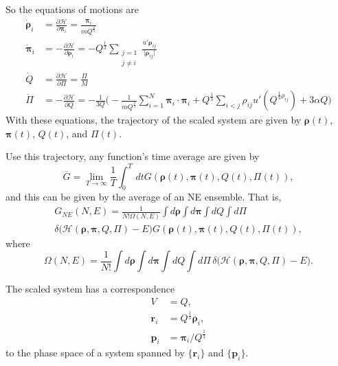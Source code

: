So the equations of motions are
\begin{align}
	\dot{ \bm{\rho} }_i & = \frac{ \partial \mathcal{H} }{ \partial \bm{\pi}_i } =
	\frac{ \bm{\pi}_i }{ m Q^{\frac{ 2 }{ 3 }} }\\
	\dot{ \bm{\pi} }_i  & = - \frac{ \partial \mathcal{H} }{ \partial \bm{\rho}_i } =
	- Q^{\frac{ 1 }{ 3 }} \sum_{\substack{j=1\\j\neq i}}
	\frac{ u' \bm{\rho}_{ij} }{ \lvert \bm{\rho}_{ij} \rvert  }\\
	\dot{ Q }           & = \frac{ \partial \mathcal{H} }{ \partial \Pi } =
	\frac{ \Pi }{ M } \\
	\dot{ \Pi }         & = - \frac{ \partial \mathcal{H} }{ \partial Q } =
	- \frac{ 1 }{ 3Q } \bigg(
	- \frac{ 1 }{ m Q^{\frac{ 2 }{ 3 }} }	\sum_{i=1}^{N} \bm{\pi}_i \cdot \bm{\pi}_i
	+ Q^{\frac{ 1 }{ 3 }} \sum_{i<j} \rho_{ij} u'(Q^{\frac{ 1 }{ 3 } \rho_{ij}}) +
	3 \alpha Q
	\bigg)
\end{align}
With these equations, the trajectory of the scaled system are given by
$\bm{\rho}(t)$, $\bm{\pi}(t)$, $Q(t)$, and $\Pi(t)$.

Use this trajectory, any function's time average are given by
\begin{equation}
	\overline{G} = \lim_{T \rightarrow \infty} \frac{ 1 }{ T } \int_{0}^{T}  \, dt
	G(\bm{\rho}(t), \bm{\pi}(t), Q(t), \Pi(t)),
\end{equation}
and this can be given by the average of an NE ensemble. That is,
\begin{multline}
	G_{NE} (N, E) = \frac{ 1 }{ N! \Omega(N,E) } \int d\bm{\rho} \int d\bm{\pi}
	\int dQ \int d\Pi \\
	\delta \big( \mathcal{H}(\bm{\rho}, \bm{\pi}, Q, \Pi)
	- E \big) G(\bm{\rho}(t), \bm{\pi}(t), Q(t), \Pi(t)),
\end{multline}
where
\begin{equation}
	\Omega(N, E) = \frac{ 1 }{ N! }  \int d\bm{\rho} \int d\bm{\pi}
	\int dQ \int d\Pi \, \delta \big( \mathcal{H}(\bm{\rho}, \bm{\pi}, Q, \Pi)
	- E \big).
\end{equation}

The scaled system has a correspondence 
\begin{align}
  V &= Q,\\
  \bm{r}_i &= Q^{\frac{ 1 }{ 3 }} \bm{\rho}_i,\\
  \bm{p}_i &= \bm{\pi}_i / Q^{\frac{ 1 }{ 3 }}
\end{align}
to the phase space of a system spanned by $\{ \bm{r}_i \}$ and
$\{ \bm{p}_i \}$.




